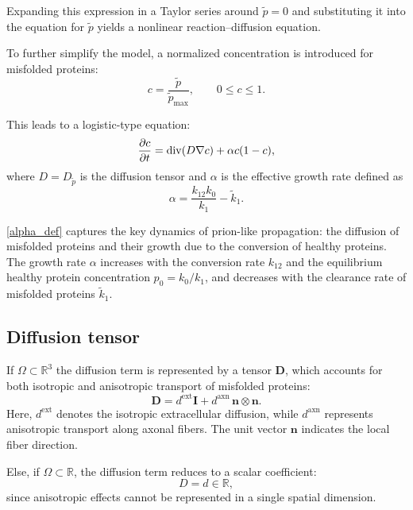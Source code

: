 \documentclass[12pt, a4paper, twoside, openright]{report}
\begin{document}
Expanding this expression in a Taylor series around $\tilde{p}=0$ and substituting it into the equation for $\tilde{p}$ yields a nonlinear reaction–diffusion equation.

To further simplify the model, a normalized concentration is introduced for misfolded proteins:
\begin{equation}
  c = \frac{\tilde{p}}{\tilde{p}_{\max}}, \qquad 0 \leq c \leq 1.
\end{equation}

This leads to a logistic-type equation:
\begin{equation}
  \pdv{c}{t} = \operatorname{div}(D \nabla c) + \alpha c (1 - c),
\end{equation}
where $D = D_{\tilde{p}}$ is the diffusion tensor and $\alpha$ is the effective growth rate defined as
\begin{equation} \label{alpha_def}
  \alpha = \frac{k_{12} k_0}{k_1} - \tilde{k}_1.
\end{equation}

\autoref{alpha_def} captures the key dynamics of prion-like propagation: the diffusion of misfolded proteins and their growth due to the conversion of healthy proteins. The growth rate $\alpha$ increases with the conversion rate $k_{12}$ and the equilibrium healthy protein concentration $p_0 = k_0/k_1$, and decreases with the clearance rate of misfolded proteins $\tilde{k}_1$.

\subsection{Diffusion tensor} \label{diff_term_math}

If $\Omega \subset \mathbb{R}^3$ the diffusion term is represented by a tensor \(\mathbf{D}\), which accounts for both isotropic and anisotropic transport of misfolded proteins:
\begin{equation}
  \mathbf{D} = d^{\mathrm{ext}} \mathbf{I} + d^{\mathrm{axn}} \, \mathbf{n} \otimes \mathbf{n}.
\end{equation}
Here, \(d^{\mathrm{ext}}\) denotes the isotropic extracellular diffusion, while \(d^{\mathrm{axn}}\) represents anisotropic transport along axonal fibers. The unit vector \(\mathbf{n}\) indicates the local fiber direction.

Else, if $\Omega \subset \mathbb{R}$, the diffusion term reduces to a scalar coefficient:
\begin{equation}
  D = d \in \mathbb{R},
\end{equation}
since anisotropic effects cannot be represented in a single spatial dimension.
\end{document}

